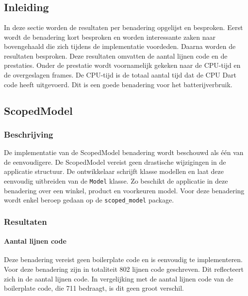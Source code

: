 

\chapter{}
\label{ch:experiment}

\section{Inleiding}
In deze sectie worden de resultaten per benadering opgelijst en besproken. Eerst wordt de benadering kort besproken en worden interessante zaken naar bovengehaald die zich tijdens de implementatie voordeden. Daarna worden de resultaten besproken. Deze resultaten omvatten de aantal lijnen code en de prestaties. \newline \newline Onder de prestatie wordt voornamelijk gekeken naar de CPU-tijd en de overgeslagen frames. De CPU-tijd  is de totaal aantal tijd dat de CPU Dart code heeft uitgevoerd. Dit is een goede benadering voor het batterijverbruik.


\section{ScopedModel}
\subsection{Beschrijving}
De implementatie van de ScopedModel benadering wordt beschouwd als één van de eenvoudigere. De ScopedModel vereist geen drastische wijzigingen in de applicatie structuur. De ontwikkelaar schrijft klasse modellen en laat deze eenvoudig uitbreiden van de \verb|Model| klasse. Zo beschikt de applicatie in deze benadering over een winkel, product en voorkeuren model. \newline
Voor deze benadering wordt enkel beroep gedaan op de \verb|scoped_model| package. 

\subsection{Resultaten}
\subsubsection{Aantal lijnen code}
Deze benadering vereist geen boilerplate code en is eenvoudig te implementeren. Voor deze benadering zijn in totaliteit 802 lijnen code geschreven. Dit reflecteert zich in de aantal lijnen code. In vergelijking met de aantal lijnen code van de boilerplate code, die 711 bedraagt, is dit geen groot verschil. 

